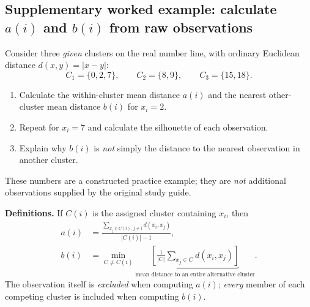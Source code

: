 \subsection*{Supplementary worked example: calculate $a(i)$ and $b(i)$ from raw observations}
\begin{reviewproblem}
Consider three \emph{given} clusters on the real number line, with ordinary Euclidean distance
$d(x,y)=|x-y|$:
\[
C_1=\{0,2,7\},\qquad C_2=\{8,9\},\qquad C_3=\{15,18\}.
\]
\begin{enumerate}[label=\textbf{(\alph*)}]
\item Calculate the within-cluster mean distance $a(i)$ and the nearest other-cluster mean distance $b(i)$ for $x_i=2$.
\item Repeat for $x_i=7$ and calculate the silhouette of each observation.
\item Explain why $b(i)$ is \emph{not} simply the distance to the nearest observation in another cluster.
\end{enumerate}
These numbers are a constructed practice example; they are \emph{not} additional observations supplied by the original study guide.
\end{reviewproblem}

\begin{center}
\end{center}

\textbf{Definitions.} If $C(i)$ is the assigned cluster containing $x_i$, then
\[
\begin{aligned}
a(i)&=\frac{\sum_{x_j\in C(i),\,j\neq i}d(x_i,x_j)}{|C(i)|-1},\\
b(i)&=\min_{C\neq C(i)}\underbrace{\left[\frac{1}{|C|}\sum_{x_j\in C}d(x_i,x_j)\right]}_{\text{mean distance to an entire alternative cluster}}.
\end{aligned}
\]
The observation itself is \emph{excluded} when computing $a(i)$; \emph{every} member of each competing cluster is included when computing $b(i)$.

